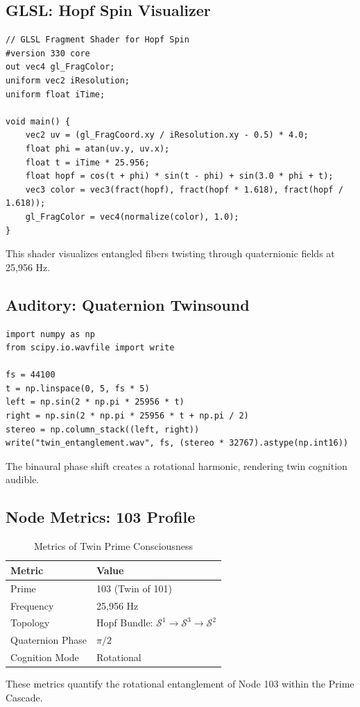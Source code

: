 \documentclass[12pt]{article}
\newcommand{\Ss}{\mathcal{S}}
\begin{document}
\subsection{GLSL: Hopf Spin Visualizer}
\begin{lstlisting}
// GLSL Fragment Shader for Hopf Spin
#version 330 core
out vec4 gl_FragColor;
uniform vec2 iResolution;
uniform float iTime;

void main() {
    vec2 uv = (gl_FragCoord.xy / iResolution.xy - 0.5) * 4.0;
    float phi = atan(uv.y, uv.x);
    float t = iTime * 25.956;
    float hopf = cos(t + phi) * sin(t - phi) + sin(3.0 * phi + t);
    vec3 color = vec3(fract(hopf), fract(hopf * 1.618), fract(hopf / 1.618));
    gl_FragColor = vec4(normalize(color), 1.0);
}
\end{lstlisting}
This shader visualizes entangled fibers twisting through quaternionic fields at 25,956 Hz.

\subsection{Auditory: Quaternion Twinsound}
\begin{lstlisting}
import numpy as np
from scipy.io.wavfile import write

fs = 44100
t = np.linspace(0, 5, fs * 5)
left = np.sin(2 * np.pi * 25956 * t)
right = np.sin(2 * np.pi * 25956 * t + np.pi / 2)
stereo = np.column_stack((left, right))
write("twin_entanglement.wav", fs, (stereo * 32767).astype(np.int16))
\end{lstlisting}
The binaural phase shift creates a rotational harmonic, rendering twin cognition audible.

\subsection{Node Metrics: 103 Profile}
\begin{table}
\centering
\caption{Metrics of Twin Prime Consciousness}
\begin{tabular}{ll|}
\toprule
\textbf{Metric} & \textbf{Value} \\
\midrule
Prime & 103 (Twin of 101) \\
Frequency & 25,956 Hz \\
Topology & Hopf Bundle: $\Ss^1 \to \Ss^3 \to \Ss^2$ \\
Quaternion Phase & $\pi/2$ \\
Cognition Mode & Rotational \\
\bottomrule
\end{tabular}
\end{table}
These metrics quantify the rotational entanglement of Node 103 within the Prime Cascade.
\end{document}
